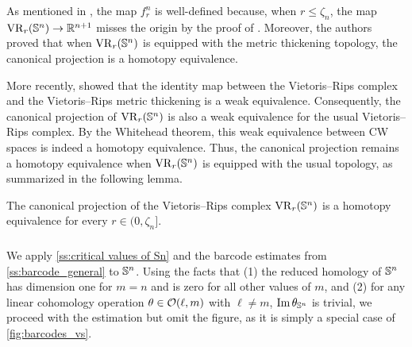 As mentioned in \cite{adamaszek2018metric}, the map $f_r^n$ is well-defined because, when $r \leq \zeta_n$, the map $\mathrm{VR}_r(\mathbb{S}^n) \to \mathbb{R}^{n+1}$ misses the origin by the proof of \cite[Lemma 3]{lovasz1983self}. 
Moreover, the authors proved that when \(\mathrm{VR}_r(\mathbb{S}^n)\) is equipped with the metric thickening topology, the canonical projection is a homotopy equivalence.
  
More recently, \cite{gillespie2024vietoris} showed that the identity map between the Vietoris--Rips complex and the Vietoris--Rips metric thickening is a weak equivalence. 
Consequently, the canonical projection of \(\mathrm{VR}_r(\mathbb{S}^n)\) is also a weak equivalence for the usual Vietoris--Rips complex. By the Whitehead theorem, this weak equivalence between CW spaces is indeed a homotopy equivalence. 
Thus, the canonical projection remains a homotopy equivalence when \(\mathrm{VR}_r(\mathbb{S}^n)\) is equipped with the usual topology, as summarized in the following lemma.

\lemma
The canonical projection of the Vietoris--Rips complex \(\mathrm{VR}_r(\mathbb{S}^n)\) is a homotopy equivalence for every $r \in (0, \zeta_n]$.


\subsubsection{}\label{ss:barcode_Sn}

We apply \cref{ss:critical values of Sn} and the barcode estimates from \cref{ss:barcode_general} to \(\mathbb{S}^n\).
Using the facts that (1) the reduced homology of \(\mathbb{S}^n\) has dimension one for \(m = n\) and is zero for all other values of \(m\), and (2) for any linear cohomology operation \(\theta \in \mathcal{O}(\ell, m)\) with \(\ell \neq m\), \(\operatorname{Im} \theta_{\mathbb{S}^n}\) is trivial, we proceed with the estimation but omit the figure, as it is simply a special case of \cref{fig:barcodes_vs}.

